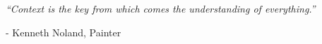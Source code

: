 \vspace*{\fill}

\begingroup
  {\it
  	``Context is the key from which comes the understanding of everything.''
  }
  \begin{flushright}
    - Kenneth Noland, Painter
  \end{flushright}
\endgroup


\vspace*{\fill}
